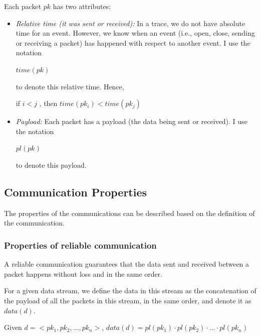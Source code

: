 Each packet $pk$ has two attributes:
\begin{itemize}
\item \textit{Relative time (it was sent or received):} In a trace, we do not have absolute time for an event. However, we know when an event (i.e., open, close, sending or receiving a packet) has happened with respect to another event. I use the notation 

$time(pk)$

to denote this relative time. Hence, 

if  $i < j $ , then  $time(pk_i) < time(pk_j)$

\item \textit{Payload:} Each packet has a payload (the data being sent or received). I use the notation 

$pl(pk)$ 

to denote this payload. 

\end{itemize}


\subsection{Communication Properties}\label{properties}
The properties of the communications can be described based on the definition of the communication.

\subsubsection{Properties of reliable communication}\label{reliablepro}
A reliable communication guarantees that the data sent and received between a packet happens without loss and in the same order.

For a given data stream, we define the data in this stream as the concatenation of the payload of all the packets in this stream, in the same order, and denote it as $data(d)$.

Given $ d=<pk_1, pk_2, ..., pk_n>$, $data(d)=pl(pk_1) \cdot pl(pk_2)\cdot \ldots \cdot pl(pk_n)$

